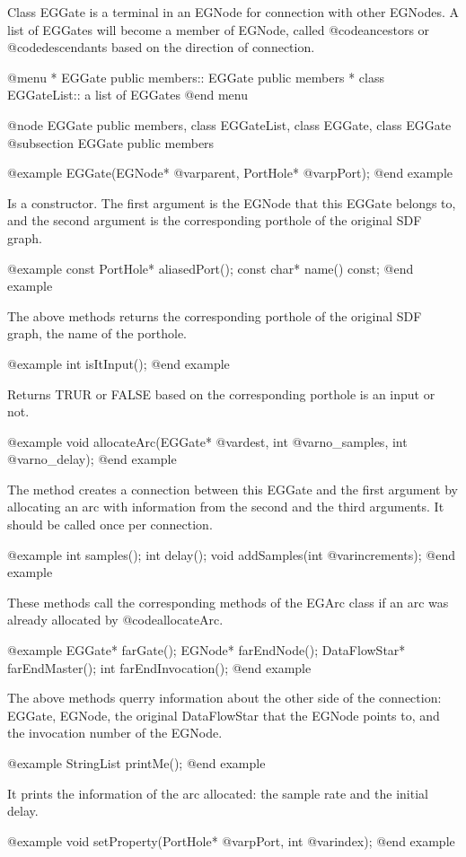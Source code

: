 Class EGGate is a terminal in an EGNode for connection with other
EGNodes. A list of EGGates will become a member of EGNode, called
@code{ancestors} or @code{descendants} based on the direction of connection.

@menu
* EGGate public members::	EGGate public members
* class EGGateList::		a list of EGGates
@end menu

@node EGGate public members, class EGGateList, class EGGate, class EGGate
@subsection EGGate public members

@example
EGGate(EGNode* @var{parent}, PortHole* @var{pPort});
@end example

Is a constructor. The first argument is the EGNode that this EGGate
belongs to, and the second argument is the corresponding porthole of
the original SDF graph.

@example
const PortHole* aliasedPort();
const char* name() const;
@end example

The above methods returns the corresponding porthole of the original
SDF graph, the name of the porthole.

@example
int isItInput();
@end example

Returns TRUR or FALSE based on the corresponding porthole is an
input or not.

@example
void allocateArc(EGGate* @var{dest}, int @var{no_samples}, int @var{no_delay});
@end example

The method creates a connection between this EGGate and the first
argument by allocating an arc with information from the second and 
the third arguments. It should be called once per connection.

@example
int samples();
int delay();
void addSamples(int @var{increments});
@end example

These methods call the corresponding methods of the EGArc class if
an arc was already allocated by @code{allocateArc}.

@example
EGGate* farGate();
EGNode* farEndNode();
DataFlowStar* farEndMaster();
int farEndInvocation();
@end example

The above methods querry information about the other side of the connection:
EGGate, EGNode, the original DataFlowStar that the EGNode points to, and
the invocation number of the EGNode. 

@example
StringList printMe();
@end example

It prints the information of the arc allocated: the sample rate and
the initial delay.

@example
void setProperty(PortHole* @var{pPort}, int @var{index});
@end example

